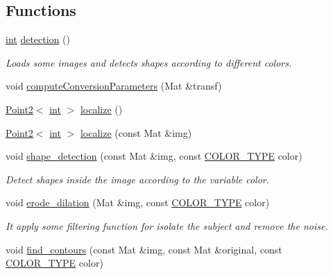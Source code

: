\subsection*{Functions}
\begin{DoxyCompactItemize}
\item 
\mbox{\hyperlink{draw_8hh_aa620a13339ac3a1177c86edc549fda9b}{int}} \mbox{\hyperlink{detection_8hh_a17e13c447692201697b084a1906cf6fb}{detection}} ()
\begin{DoxyCompactList}\small\item\em Loads some images and detects shapes according to different colors. \end{DoxyCompactList}\item 
void \mbox{\hyperlink{detection_8hh_a6dd0ff536f981bf8130318bce3c86e33}{compute\+Conversion\+Parameters}} (Mat \&transf)
\item 
\mbox{\hyperlink{class_point2}{Point2}}$<$ \mbox{\hyperlink{draw_8hh_aa620a13339ac3a1177c86edc549fda9b}{int}} $>$ \mbox{\hyperlink{detection_8hh_a94b68d9d23169964a60add8408f19235}{localize}} ()
\item 
\mbox{\hyperlink{class_point2}{Point2}}$<$ \mbox{\hyperlink{draw_8hh_aa620a13339ac3a1177c86edc549fda9b}{int}} $>$ \mbox{\hyperlink{detection_8hh_a51f1fe2f187aa38e68edb89e945d01c0}{localize}} (const Mat \&img)
\item 
void \mbox{\hyperlink{detection_8hh_a51c055450044eff527349c24c2747cac}{shape\+\_\+detection}} (const Mat \&img, const \mbox{\hyperlink{detection_8hh_aef17e8300db831cb13df4975928a52cb}{C\+O\+L\+O\+R\+\_\+\+T\+Y\+PE}} color)
\begin{DoxyCompactList}\small\item\em Detect shapes inside the image according to the variable \textquotesingle{}color\textquotesingle{}. \end{DoxyCompactList}\item 
void \mbox{\hyperlink{detection_8hh_a29a46cee302e076e220603d6bb55f8b5}{erode\+\_\+dilation}} (Mat \&img, const \mbox{\hyperlink{detection_8hh_aef17e8300db831cb13df4975928a52cb}{C\+O\+L\+O\+R\+\_\+\+T\+Y\+PE}} color)
\begin{DoxyCompactList}\small\item\em It apply some filtering function for isolate the subject and remove the noise. \end{DoxyCompactList}\item 
void \mbox{\hyperlink{detection_8hh_a26fa1540618b22726a42c239030662b4}{find\+\_\+contours}} (const Mat \&img, const Mat \&original, const \mbox{\hyperlink{detection_8hh_aef17e8300db831cb13df4975928a52cb}{C\+O\+L\+O\+R\+\_\+\+T\+Y\+PE}} color)

\end{DoxyCompactItemize}
